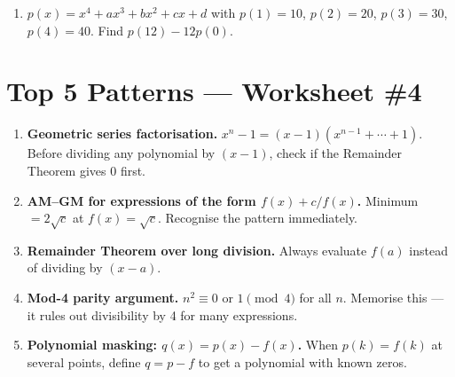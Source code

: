 \documentclass[11pt,a4paper]{article}
\begin{document}
\begin{enumerate}
\item $p(x)=x^4+ax^3+bx^2+cx+d$ with $p(1)=10$, $p(2)=20$, $p(3)=30$, $p(4)=40$. Find $p(12)-12p(0)$.

\end{enumerate}

\section*{Top 5 Patterns --- Worksheet \#4}
\begin{enumerate}[leftmargin=2em,itemsep=4pt]
  \item \textbf{Geometric series factorisation.} $x^n-1=(x-1)(x^{n-1}+\cdots+1)$. Before dividing any polynomial by $(x-1)$, check if the Remainder Theorem gives 0 first. 
  \item \textbf{AM--GM for expressions of the form $f(x)+c/f(x)$.} Minimum $=2\sqrt{c}$ at $f(x)=\sqrt{c}$. Recognise the pattern immediately. 
  \item \textbf{Remainder Theorem over long division.} Always evaluate $f(a)$ instead of dividing by $(x-a)$. 
  \item \textbf{Mod-4 parity argument.} $n^2\equiv0$ or $1\pmod4$ for all $n$. Memorise this --- it rules out divisibility by 4 for many expressions. 
  \item \textbf{Polynomial masking: $q(x)=p(x)-f(x)$.} When $p(k)=f(k)$ at several points, define $q=p-f$ to get a polynomial with known zeros. 
\end{enumerate}
\end{document}
